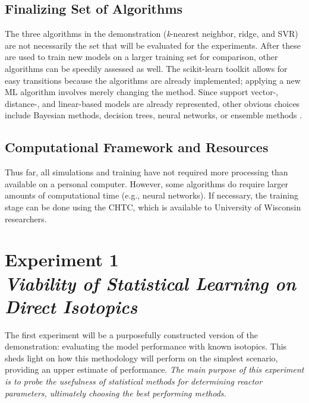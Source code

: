 \subsection*{Finalizing Set of Algorithms}

The three algorithms in the demonstration (\textit{k}-nearest neighbor, ridge,
and \gls{SVR}) are not necessarily the set that will be evaluated for the
experiments. After these are used to train new models on a larger training set
for comparison, other algorithms can be speedily assessed as well. The
scikit-learn toolkit allows for easy transitions because the algorithms are
already implemented; applying a new \gls{ML} algorithm involves merely changing
the method.  Since support vector-, distance-, and linear-based models are
already represented, other obvious choices include Bayesian methods, decision
trees, neural networks, or ensemble methods \cite{elements_stats}. 

\subsection*{Computational Framework and Resources}

Thus far, all simulations and training have not required more processing than
available on a personal computer. However, some algorithms do require larger
amounts of computational time (e.g., neural networks).  If necessary, the
training stage can be done using the \gls{CHTC}, which is available to
University of Wisconsin researchers. 

\section[Experiment 1: Direct Isotopics]{Experiment 1\\ 
\large{\textit{Viability of Statistical Learning on Direct Isotopics}}}
\label{sec:exp1}

The first experiment will be a purposefully constructed version of the
demonstration: evaluating the model performance with known isotopics.  This
sheds light on how this methodology will perform on the simplest scenario,
providing an upper estimate of performance.  \textit{The main purpose of this
experiment is to probe the usefulness of statistical methods for
determining reactor parameters, ultimately choosing the best performing
methods.}

